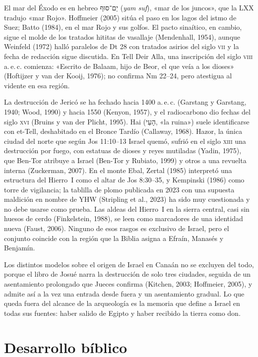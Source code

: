 \documentclass[11pt,letterpaper]{article}
\newcommand{\heb}[1]{\mbox{\foreignlanguage{hebrew}{#1}}}
\begin{document}
El mar del Éxodo es en hebreo \heb{יַם־סוּף} (\emph{yam suf}), «mar de los juncos», que la LXX tradujo «mar Rojo». Hoffmeier (2005) sitúa el paso en los lagos del istmo de Suez; Batto (1984), en el mar Rojo y sus golfos. El pacto sinaítico, en cambio, sigue el molde de los tratados hititas de vasallaje (Mendenhall, 1954), aunque Weinfeld (1972) halló paralelos de Dt 28 con tratados asirios del siglo \textsc{vii} y la fecha de redacción sigue discutida. En Tell Deir Alla, una inscripción del siglo \textsc{viii} a.\,e.\,c. comienza: «Escrito de Balaam, hijo de Beor, el que veía a los dioses» (Hoftijzer y van der Kooij, 1976); no confirma Nm 22–24, pero atestigua al vidente en esa región.

La destrucción de Jericó se ha fechado hacia 1400 a.\,e.\,c. (Garstang y Garstang, 1940; Wood, 1990) y hacia 1550 (Kenyon, 1957), y el radiocarbono dio fechas del siglo \textsc{xvi} (Bruins y van der Plicht, 1995). Hai (\heb{הָעַי}, «la ruina») suele identificarse con et-Tell, deshabitado en el Bronce Tardío (Callaway, 1968). Hazor, la única ciudad del norte que según Jos 11:10–13 Israel quemó, sufrió en el siglo \textsc{xiii} una destrucción por fuego, con estatuas de dioses y reyes mutiladas (Yadin, 1975), que Ben-Tor atribuye a Israel (Ben-Tor y Rubiato, 1999) y otros a una revuelta interna (Zuckerman, 2007). En el monte Ebal, Zertal (1985) interpretó una estructura del Hierro~I como el altar de Jos 8:30–35, y Kempinski (1986) como torre de vigilancia; la tablilla de plomo publicada en 2023 con una supuesta maldición en nombre de YHW (Stripling et al., 2023) ha sido muy cuestionada y no debe usarse como prueba. Las aldeas del Hierro~I en la sierra central, casi sin huesos de cerdo (Finkelstein, 1988), se leen como marcadores de una identidad nueva (Faust, 2006). Ninguno de esos rasgos es exclusivo de Israel, pero el conjunto coincide con la región que la Biblia asigna a Efraín, Manasés y Benjamín.

Los distintos modelos sobre el origen de Israel en Canaán no se excluyen del todo, porque el libro de Josué narra la destrucción de solo tres ciudades, seguida de un asentamiento prolongado que Jueces confirma (Kitchen, 2003; Hoffmeier, 2005), y admite así a la vez una entrada desde fuera y un asentamiento gradual. Lo que queda fuera del alcance de la arqueología es la memoria que define a Israel en todas sus fuentes: haber salido de Egipto y haber recibido la tierra como don.

\section{Desarrollo bíblico}
\end{document}
